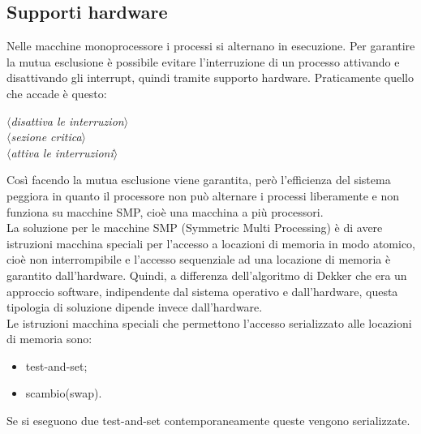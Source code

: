 \documentclass[12pt, letterpaper]{report}
\begin{document}
	\subsection{Supporti hardware}
	Nelle macchine monoprocessore i processi si alternano in esecuzione. Per garantire la mutua esclusione è possibile evitare l'interruzione di un processo attivando e disattivando gli interrupt, quindi tramite supporto hardware. Praticamente quello che accade è questo:
	\begin{center}
		\textit{$\langle$disattiva le interruzion$\rangle$} \\
		\textit{$\langle$sezione critica$\rangle$} \\
		\textit{$\langle$attiva le interruzioni$\rangle$}
	\end{center}
	Così facendo la mutua esclusione viene garantita, però l'efficienza del sistema peggiora in quanto il processore non può alternare i processi liberamente e non funziona su macchine SMP, cioè una macchina a più processori. \\
	La soluzione per le macchine SMP (Symmetric Multi Processing) è di avere istruzioni macchina speciali per l'accesso a locazioni di memoria in modo atomico, cioè non interrompibile e l'accesso sequenziale ad una locazione di memoria è garantito dall'hardware. Quindi, a differenza dell'algoritmo di Dekker che era un approccio software, indipendente dal sistema operativo e dall'hardware, questa tipologia di soluzione dipende invece dall'hardware. \\
	Le istruzioni macchina speciali che permettono l'accesso serializzato alle locazioni di memoria sono:
	\begin{itemize}
		\item test-and-set;
		\item scambio(swap).
	\end{itemize}
	Se si eseguono due test-and-set contemporaneamente queste vengono serializzate.
\end{document}
